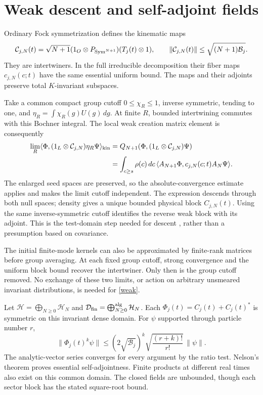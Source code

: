 \documentclass[11pt,a4paper]{article}
\newcommand{\HH}{\mathcal H}\newcommand{\MM}{\mathcal M}
\begin{document}
\newpage
\section{Weak descent and self-adjoint fields}
Ordinary Fock symmetrization defines the kinematic maps
\[
 {\cal C}_{j,N}(t)=\sqrt{N+1}
 (1_O\otimes P_{\mathrm{Sym}^{N+1}})
 (T_j(t)\otimes1),\qquad
 \|{\cal C}_{j,N}(t)\|\le\sqrt{(N+1)\mathcal B_j}.
\]
They are intertwiners. In the full irreducible decomposition their
fiber maps $c_{j,N}(c;t)$ have the same essential uniform bound.
The maps and their adjoints preserve total $K$-invariant subspaces.

Take a common compact group cutoff $0\le\chi_R\le1$, inverse symmetric,
tending to one, and $\eta_R=\int\chi_R(g)U(g)\,dg$.
At finite $R$, bounded intertwining commutes with this Bochner integral.
The local weak creation matrix element is consequently
\begin{align}
 \lim_R\langle\Phi,(1_L\otimes{\cal C}_{j,N})\eta_R\Psi\rangle_{\rm kin}
 &=Q_{N+1}(\Phi,(1_L\otimes{\cal C}_{j,N})\Psi)\nonumber\\
 &=\int_{c\ge s}\rho(c)\,dc\,
 \langle A_{N+1}\Phi,c_{j,N}(c;t)A_N\Psi\rangle .
 \label{weak}
\end{align}
The enlarged seed spaces are preserved, so the absolute-convergence
estimate applies and makes the limit cutoff independent.
The expression descends through both null spaces; density gives a
unique bounded physical block $C_{j,N}(t)$.
Using the same inverse-symmetric cutoff identifies the reverse weak
block with its adjoint. This is the test-domain step needed for descent
\cite{raq}, rather than a presumption based on covariance.

The initial finite-mode kernels can also be approximated by finite-rank
matrices before group averaging. At each fixed group cutoff, strong
convergence and the uniform block bound recover the intertwiner.
Only then is the group cutoff removed. No exchange of these two
limits, or action on arbitrary unsmeared invariant distributions,
is needed for \eqref{weak}.

Let $\HH=\bigoplus_{N\ge0}\HH_N$ and
$\mathcal D_{\rm fin}=\bigoplus_{N\ge0}^{\rm alg}\HH_N$.
Each $\Phi_j(t)=C_j(t)+C_j(t)^*$ is symmetric on this invariant dense
domain. For $\psi$ supported through particle number $r$,
\[
 \|\Phi_j(t)^k\psi\|\le
 (2\sqrt{\mathcal B_j})^k\sqrt{\frac{(r+k)!}{r!}}\,\|\psi\|.
\]
The analytic-vector series converges for every argument by the ratio
test. Nelson's theorem \cite{nelson} proves essential self-adjointness.
Finite products at different real times also exist on this common
domain. The closed fields are unbounded, though each sector block
has the stated square-root bound.
\end{document}
